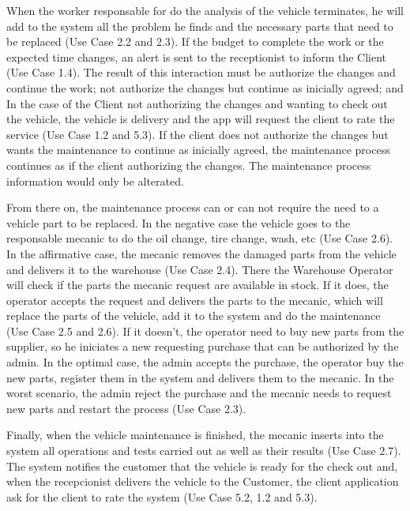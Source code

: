 When the worker responsable for do the analysis of the vehicle terminates, he will add to the system all the problem he finds and the necessary parts that need to be replaced (Use Case 2.2 and 2.3).
If the budget to complete the work or the expected time changes, an alert is sent to the receptionist to inform the Client (Use Case 1.4). 
The result of this interaction must be authorize the changes and continue the work; not authorize the changes but continue as inicially agreed; and 
In the case of the Client not authorizing the changes and wanting to check out the vehicle, the vehicle is delivery and the app will request the client to rate the service (Use Case 1.2 and 5.3). 
If the client does not authorize the changes but wants the maintenance to continue as inicially agreed, the maintenance process continues as if the client authorizing the changes. 
The maintenance process information would only be alterated.

From there on, the maintenance process can or can not require the need to a vehicle part to be replaced. 
In the negative case the vehicle goes to the responsable mecanic to do the oil change, tire change, wash, etc (Use Case 2.6). 
In the affirmative case, the mecanic removes the damaged parts from the vehicle and delivers it to the warehouse (Use Case 2.4).
There the Warehouse Operator will check if the parts the mecanic request are available in stock. 
If it does, the operator accepts the request and delivers the parts to the mecanic, which will replace the parts of the vehicle, add it to the system and do the maintenance (Use Case 2.5 and 2.6). 
If it doesn't, the operator need to buy new parts from the supplier, so he iniciates a new requesting purchase that can be authorized by the admin. 
In the optimal case, the admin accepts the purchase, the operator buy the new parts, register them in the system and delivers them to the mecanic. 
In the worst scenario, the admin reject the purchase and the mecanic needs to request new parts and restart the process (Use Case 2.3).    

Finally, when the vehicle maintenance is finished, the mecanic inserts into the system all operations and tests carried out as well as their results (Use Case 2.7). 
The system notifies the customer that the vehicle is ready for the check out and, when the recepcionist delivers the vehicle to the Customer, the client application ask for the client to rate the system (Use Case 5.2, 1.2 and 5.3).

